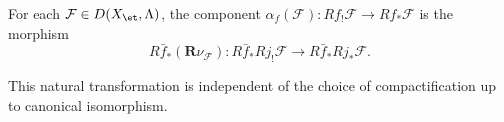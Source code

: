 \begin{definition}
For each $\mathcal{F} \in D(X_{\et}, \Lambda)$, the component $\alpha_f(\mathcal{F}): Rf_! \mathcal{F} \to Rf_* \mathcal{F}$ is the morphism
$$R\bar{f}_*(\mathbf{R}\nu_\mathcal{F}): R\bar{f}_* Rj_! \mathcal{F} \longrightarrow R\bar{f}_* Rj_* \mathcal{F}.$$

This natural transformation is independent of the choice of compactification up to canonical isomorphism.
\end{definition}
